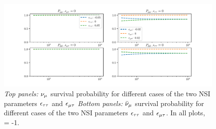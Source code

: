 \documentclass[draft=True]{thesis}
\begin{document}
\begin{figure}\label{fig:IC_NSI_probs}
    \begin{center}
    \includegraphics[width=1\textwidth, height=0.3\textheight]{figures/IC_NSI_probs.pdf}
    \caption{\emph{Top panels: }$\nu_\mu$ survival probability for different cases of the two NSI parameters $\epsilon_{\tau\tau}$ and $\epsilon_{\mu\tau}$
    \emph{Bottom panels: }$\bar\nu_\mu$ survival probability for different cases of the two NSI parameters $\epsilon_{\tau\tau}$ and $\epsilon_{\mu\tau}$.
    In all plots, \ztrue = -1.}
    \end{center}
\end{figure}
\end{document}
